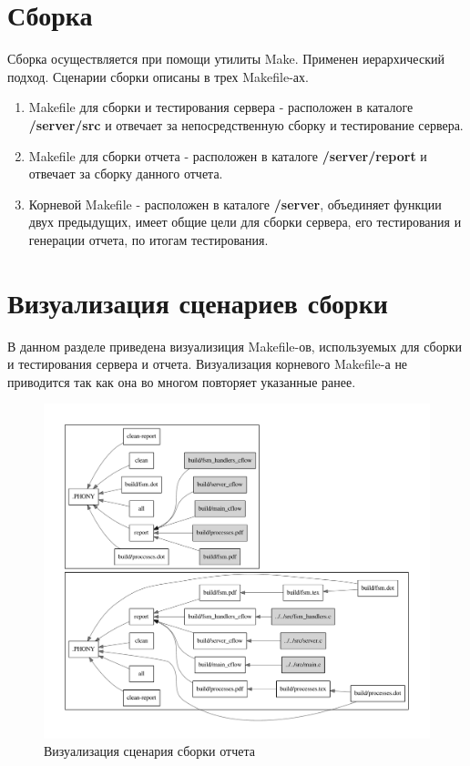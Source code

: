 \documentclass[a4paper,12pt]{report}
\begin{document}
\section{Сборка}
Сборка осуществляется при помощи утилиты Make. Применен иерархический подход. Сценарии сборки описаны в трех Makefile-ах. 
\begin{enumerate}
	\item Makefile для сборки и тестирования сервера - расположен в каталоге \textbf{/server/src} и отвечает за непосредственную сборку и тестирование сервера. 
	\item Makefile для сборки отчета - расположен в каталоге \textbf{/server/report} и отвечает за сборку данного отчета. 
	\item Корневой Makefile - расположен в каталоге \textbf{/server}, объединяет функции двух предыдущих, имеет общие цели для сборки сервера, его тестирования и генерации отчета, по итогам тестирования. 	
\end{enumerate}

\section{Визуализация сценариев сборки}
В данном разделе приведена визуализиция Makefile-ов, используемых для сборки и тестирования сервера и отчета. 
Визуализация корневого Makefile-а не приводится так как она во многом повторяет указанные ранее. 
\begin{figure}[H]
	\centering
	\includegraphics[width=\textwidth]{include/report_make.pdf}
	\caption{Визуализация сценария сборки отчета}
	\label{fig:make2}
\end{figure}
\end{document}
